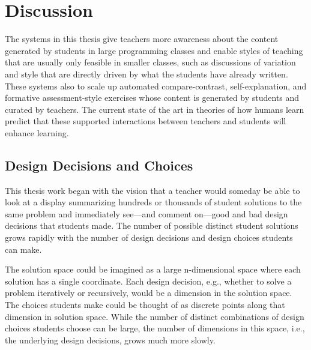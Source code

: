 \chapter{Discussion}\label{chapter:discussion}

The systems in this thesis give teachers more awareness about the content generated by students in large programming classes and enable styles of teaching that are usually only feasible in smaller classes, such as discussions of variation and style that are directly driven by what the students have already written. These systems also to scale up automated compare-contrast, self-explanation, and formative assessment-style exercises whose content is generated by students and curated by teachers.  The current state of the art in theories of how humans learn predict that these supported interactions between teachers and students will enhance learning.


\section{Design Decisions and Choices}


This thesis work began with the vision that a teacher would someday be able to look at a display summarizing hundreds or thousands of student solutions to the same problem and immediately see---and comment on---good and bad design decisions that students made. The number of possible distinct student solutions grows rapidly with the number of design decisions and design choices students can make. 

The solution space could be imagined as a large n-dimensional space where each solution has a single coordinate. Each design decision, e.g., whether to solve a problem iteratively or recursively, would be a dimension in the solution space. The choices students make could be thought of as discrete points along that dimension in solution space. While the number of distinct combinations of design choices students choose can be large, the number of dimensions in this space, i.e., the underlying design decisions, grows much more slowly. 

